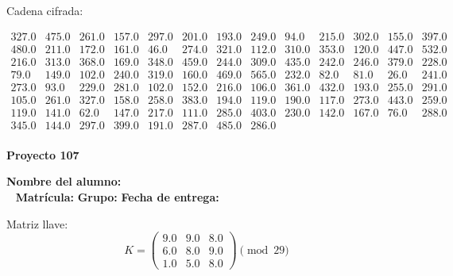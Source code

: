 \documentclass[12pt]{article}
\begin{document}
Cadena cifrada:
\begin{center}
$\begin{array}{lllllllllllll}
327.0 & 475.0 & 261.0 & 157.0 & 297.0 & 201.0 & 193.0 & 249.0 & 94.0 & 215.0 & 302.0 & 155.0 & 397.0\\
480.0 & 211.0 & 172.0 & 161.0 & 46.0 & 274.0 & 321.0 & 112.0 & 310.0 & 353.0 & 120.0 & 447.0 & 532.0\\
216.0 & 313.0 & 368.0 & 169.0 & 348.0 & 459.0 & 244.0 & 309.0 & 435.0 & 242.0 & 246.0 & 379.0 & 228.0\\
79.0 & 149.0 & 102.0 & 240.0 & 319.0 & 160.0 & 469.0 & 565.0 & 232.0 & 82.0 & 81.0 & 26.0 & 241.0\\
273.0 & 93.0 & 229.0 & 281.0 & 102.0 & 152.0 & 216.0 & 106.0 & 361.0 & 432.0 & 193.0 & 255.0 & 291.0\\
105.0 & 261.0 & 327.0 & 158.0 & 258.0 & 383.0 & 194.0 & 119.0 & 190.0 & 117.0 & 273.0 & 443.0 & 259.0\\
119.0 & 141.0 & 62.0 & 147.0 & 217.0 & 111.0 & 285.0 & 403.0 & 230.0 & 142.0 & 167.0 & 76.0 & 288.0\\
345.0 & 144.0 & 297.0 & 399.0 & 191.0 & 287.0 & 485.0 & 286.0\\
\end{array}$
\end{center}

\newpage


\textbf{Proyecto 107}

\textbf{Nombre del alumno:} \underline{\hspace{13cm}}\\\
\vspace{1cm}
\textbf{Matrícula:} \underline{\hspace{4cm}} \hspace{1cm}
\textbf{Grupo:} \underline{\hspace{2cm}}
\textbf{Fecha de entrega:} \underline{\hspace{2cm}}

\medskip

Matriz llave:
\[
K = \begin{pmatrix}
9.0 & 9.0 & 8.0\\
6.0 & 8.0 & 9.0\\
1.0 & 5.0 & 8.0
\end{pmatrix} \pmod{29}
\]
\end{document}

